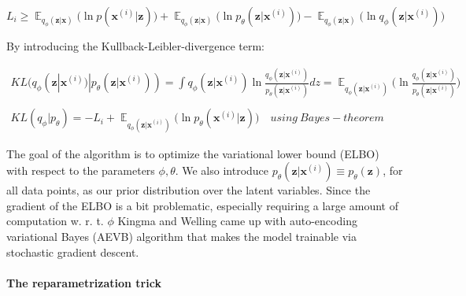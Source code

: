 \documentclass[12pt, english]{article}
\DeclareMathOperator*{\E}{\mathbb{E}}
\begin{document}
\vspace{4mm}

\begin{equation}
    L_{i} \geq \E_{q_{\phi}(\bm{z} | \bm{x})} \Big( \ln p(\bm{x}^{(i)} | \bm{z}) \Big) + \E_{q_{\phi}(\bm{z} | \bm{x})} \Big( \ln p_{\theta}(\bm{z} | \bm{x}^{(i)}) \Big) - \E_{q_{\phi}(\bm{z} | \bm{x})} \Big( \ln q_{\phi}(\bm{z} | \bm{x}^{(i)}) \Big)
\end{equation}

\vspace{4mm}

\par By introducing the Kullback-Leibler-divergence term:

\vspace{4mm}

\begin{gather*}
    KL(q_{\phi}(\bm{z} | \bm{x}^{(i)}) | p_{\theta}(\bm{z} | \bm{x}^{(i)})) = \int q_{\phi}(\bm{z} | \bm{x}^{(i)})\ln \frac{q_{\phi}(\bm{z} | \bm{x}^{(i)})}{p_{\theta}(\bm{z} | \bm{x}^{(i)})}dz = \E_{q_{\phi}(\bm{z} | \bm{x}^{(i)})} \Big( \ln \frac{q_{\phi}(\bm{z} | \bm{x}^{(i)})}{p_{\theta}(\bm{z}|\bm{x}^{(i)})}  \Big) \\ \\
    KL(q_{\phi} | p_{\theta}) = -L_{i} + \E_{q_{\phi}(\bm{z} | \bm{x}^{(i)})} \Big( \ln p_{\theta}(\bm{x}^{(i)} | \bm{z}) \Big) \quad using\ Bayes-theorem
\end{gather*}

\vspace{4mm}

\par The goal of the algorithm is to optimize the variational lower bound (ELBO) with respect to the parameters $\phi, \theta$. We also introduce $p_{\theta}(\bm{z} | \bm{x}^{(i)}) \equiv p_{\theta}(\bm{z})$, for all data points, as our prior distribution over the latent variables. Since the gradient of the ELBO is a bit problematic, especially requiring a large amount of computation w. r. t. $\phi$ Kingma and Welling came up with auto-encoding variational Bayes (AEVB) algorithm that makes the model trainable via stochastic gradient descent.

\paragraph{The reparametrization trick \newline \newline}
\end{document}
